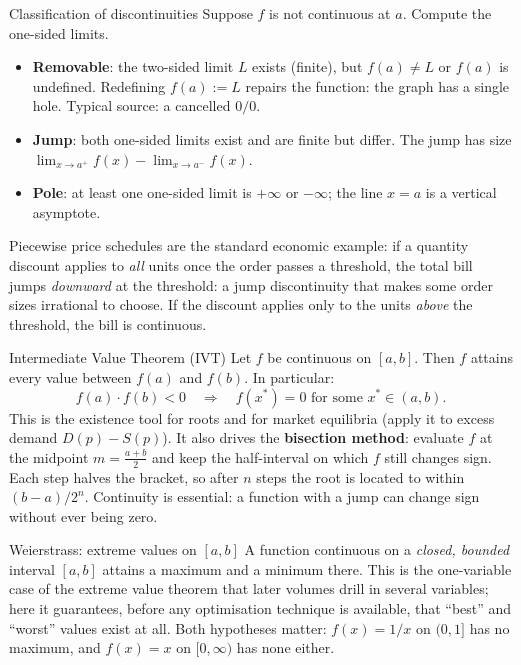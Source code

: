 \begin{rulebox}{Classification of discontinuities}
Suppose $f$ is not continuous at $a$. Compute the one-sided limits.
\begin{itemize}[leftmargin=1.6em,itemsep=0.3ex]
  \item \textbf{Removable}: the
        two-sided limit $L$ exists (finite), but $f(a)\neq L$ or $f(a)$
        is undefined. Redefining $f(a):=L$ repairs the function:
        the graph has a single hole. Typical source: a cancelled $0/0$.
  \item \textbf{Jump}: both one-sided limits exist
        and are finite but differ. The jump has size
        $\lim_{x\to a^{+}}f(x)-\lim_{x\to a^{-}}f(x)$.
  \item \textbf{Pole}: at least one one-sided limit is
        $+\infty$ or $-\infty$; the line $x=a$ is a vertical asymptote.
\end{itemize}
Piecewise price schedules are the standard economic example: if a
quantity discount applies to \emph{all} units once the order passes a
threshold, the total bill jumps \emph{downward} at the threshold: a
jump discontinuity that makes some order sizes irrational to choose. If
the discount applies only to the units \emph{above} the threshold, the
bill is continuous.
\end{rulebox}

\begin{rulebox}{Intermediate Value Theorem (IVT)}
Let $f$ be continuous on $[a,b]$. Then $f$
attains every value between $f(a)$ and $f(b)$. In particular:
\[
  f(a)\cdot f(b)<0
  \quad\Longrightarrow\quad
  f(x^{*})=0 \text{ for some } x^{*}\in(a,b).
\]
This is the existence tool for roots and for market equilibria (apply it
to excess demand $D(p)-S(p)$). It also drives the \textbf{bisection
method}: evaluate $f$ at the midpoint $m=\tfrac{a+b}{2}$ and keep the
half-interval on which $f$ still changes sign. Each step halves the
bracket, so after $n$ steps the root is located to within
$(b-a)/2^{n}$. Continuity is essential: a function with a jump can change
sign without ever being zero.
\end{rulebox}

\begin{rulebox}{Weierstrass: extreme values on $[a,b]$}
A function continuous on a \emph{closed, bounded} interval $[a,b]$
attains a maximum and a minimum there.
This is the one-variable case of the extreme value theorem that later
volumes drill in several variables; here it guarantees, before any
optimisation technique is available, that ``best'' and ``worst'' values
exist at all. Both hypotheses matter: $f(x)=1/x$ on $(0,1]$ has no
maximum, and $f(x)=x$ on $[0,\infty)$ has none either.
\end{rulebox}

